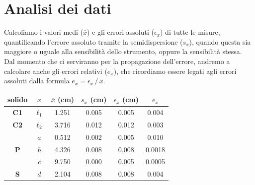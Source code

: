 \documentclass[12pt]{scrartcl}
\begin{document}
\section{Analisi dei dati}

Calcoliamo i valori medi (\(\overline{x}\)) e gli errori assoluti (\(\epsilon_x\))
di tutte le misure, quantificando l'errore assoluto tramite la semidispersione
(\(s_x\)), quando questa sia maggiore o uguale alla sensibilità dello strumento,
oppure la sensibilità stessa. Dal momento che ci serviranno per la propagazione
dell'errore, andremo a calcolare anche gli errori relativi (\(e_x\)),
che ricordiamo essere legati agli errori assoluti dalla formula
\(e_x = {\epsilon_x} \, / \, {\overline{x}}\).

\begin{center}\begin{tabular}{cccccc}
  \toprule
  \textbf{solido} & \(x\) & \(\overline{x}\) (\si{\centi\metre}) & \(s_x\) (\si{\centi\metre}) & \(\epsilon_x\) (\si{\centi\metre}) & \(e_x\)\\
  \midrule
  \textbf{C1} & \(\ell_1\) & \num{1.251} & \num{0.005} & \num{0.005} & \num{0.004}\\
  \midrule
  \textbf{C2} & \(\ell_2\) & \num{3.716} & \num{0.012} & \num{0.012} & \num{0.003} \\
  \midrule
  \multirow{3}{*}{\textbf{P}} & \(a\) & \num{0.512} & \num{0.002} & \num{0.005} & \num{0.010}\\
                              & \(b\) & \num{4.326} & \num{0.008} & \num{0.008} & \num{0.0018} \\
                              & \(c\) & \num{9.750} & \num{0.000} & \num{0.005} & \num{0.0005} \\
  \midrule
  \textbf{S} & \(d\) & \num{2.104} & \num{0.008} & \num{0.008} & \num{0.004} \\
  \bottomrule
\end{tabular}\end{center}
\end{document}
